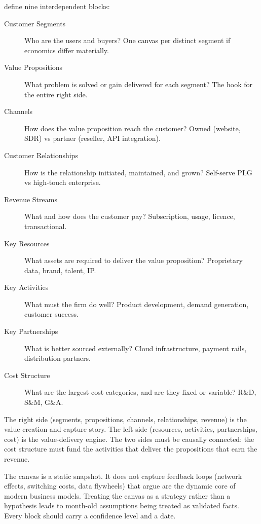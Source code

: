 \textcite{osterwalder2010} define nine interdependent blocks:
\begin{description}
  \item[Customer Segments] Who are the users and buyers? One canvas per distinct segment if economics differ materially.
  \item[Value Propositions] What problem is solved or gain delivered for each segment? The hook for the entire right side.
  \item[Channels] How does the value proposition reach the customer? Owned (website, SDR) vs partner (reseller, API integration).
  \item[Customer Relationships] How is the relationship initiated, maintained, and grown? Self-serve PLG vs high-touch enterprise.
  \item[Revenue Streams] What and how does the customer pay? Subscription, usage, licence, transactional.
  \item[Key Resources] What assets are required to deliver the value proposition? Proprietary data, brand, talent, IP.
  \item[Key Activities] What must the firm do well? Product development, demand generation, customer success.
  \item[Key Partnerships] What is better sourced externally? Cloud infrastructure, payment rails, distribution partners.
  \item[Cost Structure] What are the largest cost categories, and are they fixed or variable? R\&D, S\&M, G\&A.
\end{description}
The right side (segments, propositions, channels, relationships, revenue) is the value-creation and capture story. The left side (resources, activities, partnerships, cost) is the value-delivery engine. The two sides must be causally connected: the cost structure must fund the activities that deliver the propositions that earn the revenue.

The canvas is a static snapshot. It does not capture feedback loops (network effects, switching costs, data flywheels) that \textcite{zott2011business} argue are the dynamic core of modern business models. Treating the canvas as a strategy rather than a hypothesis leads to month-old assumptions being treated as validated facts. Every block should carry a confidence level and a date.

